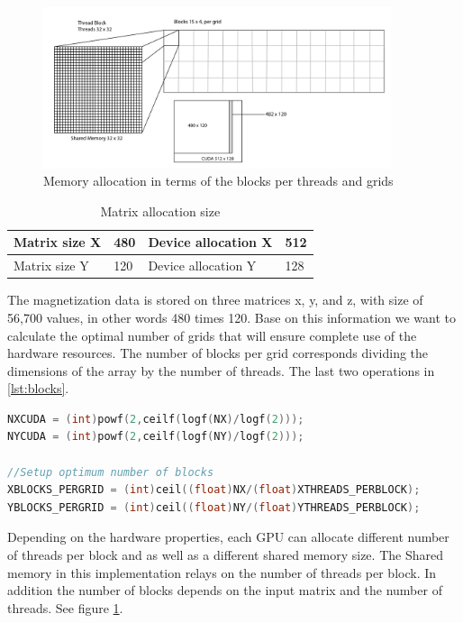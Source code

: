 \begin{figure}[htbp]
	\centering
		\includegraphics[width=0.91\textwidth]{Figures/block.png}
		\smallskip
	\caption[Grid layout]{Memory allocation in terms of the blocks per threads and grids}
	\label{fig:block}
\end{figure}


\begin{table}[h]
\centering
\begin{tabular}{| l | l | l | l | }
\hline
Matrix size X & 480 & Device allocation X & 512\\
\hline
Matrix size Y & 120 & Device allocation Y & 128 \\
\hline
\end{tabular}
\caption{Matrix allocation size}
\label{tab:cuda}
\end{table}

The magnetization data is stored on three matrices x, y, and z, with size of 56,700 values, in other words 480 times 120. Base on this information we want to calculate the optimal number of grids that will ensure complete use of the hardware resources. The number of blocks per grid corresponds dividing the dimensions of the array by the number of threads. The last two operations in \ref{lst:blocks}.

\begin{lstlisting}[language=C++, label={lst:blocks}, caption={Device capacity calculation and number of block per grid}]	
NXCUDA = (int)powf(2,ceilf(logf(NX)/logf(2)));
NYCUDA = (int)powf(2,ceilf(logf(NY)/logf(2)));

//Setup optimum number of blocks
XBLOCKS_PERGRID = (int)ceil((float)NX/(float)XTHREADS_PERBLOCK); 
YBLOCKS_PERGRID = (int)ceil((float)NY/(float)YTHREADS_PERBLOCK);
\end{lstlisting}


Depending on the hardware properties, each GPU can allocate different number of threads per block and as well as a different shared memory size. The Shared memory in this implementation relays on the number of threads per block. In addition the number of blocks depends on the input matrix and the number of threads. See figure \ref{fig:block}.

